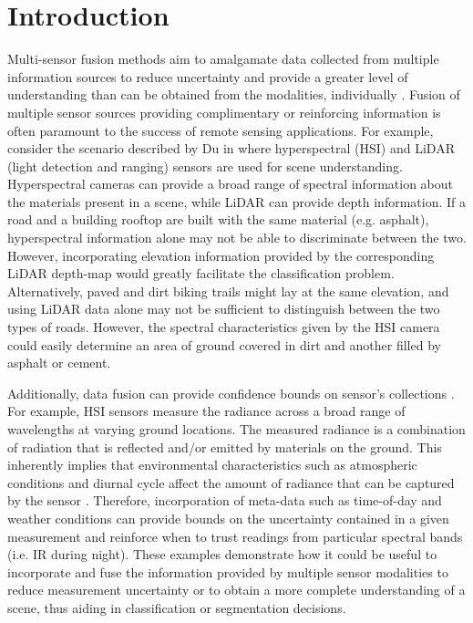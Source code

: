 \chapter{Introduction}
\vspace{1cm}
Multi-sensor fusion methods aim to amalgamate data collected from multiple information sources to reduce uncertainty and provide a greater level of understanding than can be obtained from the modalities, individually \cite{hackett1990multisensorfusion,zhang2010multisourceremotingsensingfusion}.  Fusion of multiple sensor sources providing complimentary or reinforcing information is often paramount to the success of remote sensing applications.  For example, consider the scenario described by Du in \cite{Du2017Thesis} where hyperspectral (HSI) and LiDAR (light detection and ranging) sensors are used for scene understanding. Hyperspectral cameras can provide a broad range of spectral information about the materials present in a scene, while LiDAR can provide depth information.  If a road and a building rooftop are built with the same material (e.g. asphalt), hyperspectral information alone may not be able to discriminate between the two. However, incorporating elevation information provided by the corresponding LiDAR depth-map would greatly facilitate the classification problem.  Alternatively, paved and dirt biking trails might lay at the same elevation, and using LiDAR data alone may not be sufficient to distinguish between the two types of roads.  However, the spectral characteristics given by the HSI camera could easily determine an area of ground covered in dirt and another filled by asphalt or cement.  

Additionally, data fusion can provide confidence bounds on sensor's collections \cite{hackett1990multisensorfusion,Mohandes2018ClassifierCombinationTechniquesReview}.  For example, HSI sensors measure the radiance across a broad range of wavelengths at varying ground locations.  The measured radiance is a combination of radiation that is reflected and/or emitted by materials on the ground.  This inherently implies that environmental characteristics such as atmospheric conditions and diurnal cycle affect the amount of radiance that can be captured by the sensor \cite{Zare2008Thesis}.  Therefore, incorporation of meta-data such as time-of-day and weather conditions can provide bounds on the uncertainty contained in a given measurement and reinforce when to trust readings from particular spectral bands (i.e. IR during night).   These examples demonstrate how it could be useful to incorporate and fuse the information provided by multiple sensor modalities to reduce measurement uncertainty or to obtain a more complete understanding of a scene, thus aiding in classification or segmentation decisions.
\newline

